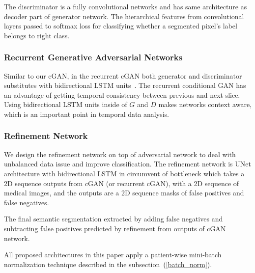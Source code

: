 \documentclass[10pt,twocolumn,letterpaper]{article}
\begin{document}
The discriminator is a fully convolutional networks and has same architecture as decoder part of generator network. The hierarchical features from convolutional layers passed to softmax loss for classifying whether a segmented pixel's label belongs to right class.

\subsubsection{Recurrent Generative Adversarial Networks}\label{method_sec1b}
Similar to our cGAN, in the recurrent cGAN both generator and discriminator substitutes with bidirectional LSTM units~\cite{graves2005framewise}.
The recurrent conditional GAN has an advantage of getting temporal consistency between previous and next slice.
Using bidirectional LSTM units inside of $G$ and $D$ makes networks context aware, which is an important point in temporal data analysis.

\subsubsection{Refinement Network}\label{refarch}

We design the refinement network on top of adversarial network to deal with unbalanced data issue and improve classification. The refinement network is UNet architecture with bidirectional LSTM in circumvent of bottleneck which takes a 2D sequence outputs from cGAN (or recurrent cGAN), with a 2D sequence of medical images, and the outputs are a 2D sequence masks of false positives and false negatives.

The final semantic segmentation extracted by adding false negatives and subtracting false positives predicted by refinement from outputs of cGAN network.

All proposed architectures in this paper apply a patient-wise mini-batch normalization technique described in the subsection~(\ref{batch_norm}).
\end{document}

